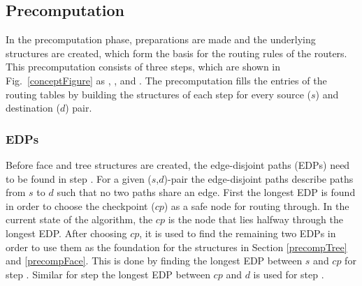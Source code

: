 \documentclass[conference]{IEEEtran}
\begin{document}
\subsection{Precomputation}
\label{precomputation}
In the precomputation phase, preparations are made and the underlying structures are created, which form the basis for the routing rules of the routers. This precomputation consists of three steps, which are shown in Fig.~\ref{conceptFigure} as , , and . The precomputation fills the entries of the routing tables by building the structures of each step for every source ($s$) and destination ($d$) pair.

\subsubsection{EDPs}
Before face and tree structures are created, the edge-disjoint paths (EDPs) need to be found in step .
For a given ($s$,$d$)-pair the edge-disjoint paths describe paths from $s$ to $d$ such that no two paths share an edge.
First the longest EDP is found in order to choose the checkpoint ($cp$) as a safe node for routing through.
In the current state of the algorithm, the $cp$ is the node that lies halfway through the longest EDP.
After choosing $cp$, it is used to find the remaining two EDPs in order to use them as the foundation for the structures in Section \ref{precompTree} and \ref{precompFace}.
This is done by finding the longest EDP between $s$ and $cp$ for step .
Similar for step  the longest EDP between $cp$ and $d$ is used for step .
\end{document}
